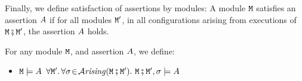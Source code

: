 %
%

Finally, we define satisfaction of assertions by modules: A module $\M$ satisfies an assertion $\A$ if for all modules $\M'$, in all configurations arising from executions of $\M\mkpair\M'$, the assertion $\A$ holds.

\begin{definition}
\label{def:module_satisfies}
For any module $\M$, and  assertion $\A$, we define:
\begin{itemize}
\item
$\M \models \A$ \IFF  $\forall \M'.\, \forall \sigma\!\in\!\Arising{\M\mkpair\M'}.\   \M\mkpair\M', \sigma \models \A$
\end{itemize}
\end{definition}



